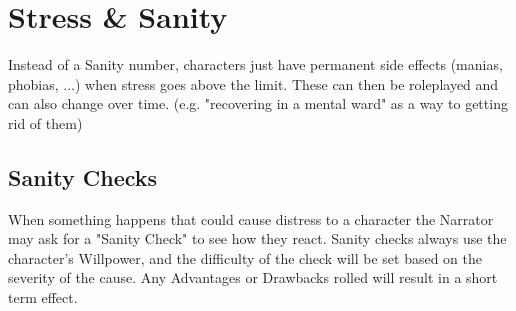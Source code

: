     

    
\chapter{Stress \& Sanity}

Instead of a Sanity number, characters just have permanent side effects (manias, phobias, ...) when stress goes above the limit. These can then be roleplayed and can also change over time. (e.g. "recovering in a mental ward" as a way to getting rid of them)

\section{Sanity Checks}
When something happens that could cause distress to a character 
the Narrator may ask for a "Sanity Check" to see how they react.
Sanity checks always use the character's Willpower, and the difficulty of the check will be set based on the severity of the cause. 
Any Advantages or Drawbacks rolled will result in a short term effect.

